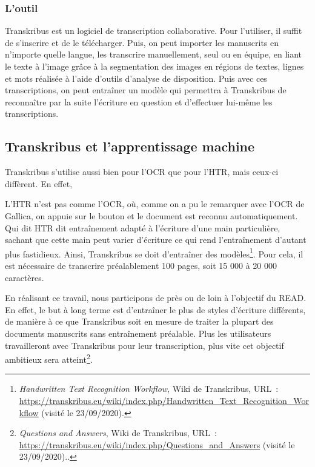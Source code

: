 \subsubsection{L'outil}

Transkribus est un logiciel de transcription collaborative. 
Pour l'utiliser, il suffit de s'inscrire et de le télécharger. Puis, on peut importer les manuscrits en n'importe quelle langue, les transcrire manuellement, seul ou en équipe, en liant le texte à l'image grâce à la segmentation des images en régions de textes, lignes et mots réalisée à l'aide d'outils d'analyse de disposition. Puis avec ces transcriptions, on peut entraîner un modèle qui permettra à Transkribus de reconnaître par la suite l’écriture en question et d’effectuer lui-même les transcriptions.	

\subsection{Transkribus et l'apprentissage machine}

Transkribus s'utilise aussi bien pour l'OCR que pour l'HTR, mais ceux-ci diffèrent. En effet, 
\begin{quote}
\end{quote}
L'HTR n'est pas comme l'OCR, où, comme on a pu le remarquer avec l'OCR de Gallica, on appuie sur le bouton et le document est reconnu automatiquement. Qui dit HTR dit entraînement adapté à l'écriture d'une main particulière, sachant que cette main peut varier d'écriture ce qui rend l'entraînement d'autant plus fastidieux. Ainsi, Transkribus se doit d'entraîner des modèles\footnote{\emph{Handwritten Text Recognition Workflow}, Wiki de Transkribus, URL~: \url{https://transkribus.eu/wiki/index.php/Handwritten_Text_Recognition_Workflow} (visité le 23/09/2020).}. Pour cela, il est nécessaire de transcrire préalablement 100 pages, soit 15 000 à 20 000 caractères. 

En réalisant ce travail, nous participons de près ou de loin à l'objectif du READ. En effet, le but à long terme est d'entraîner le plus de styles d'écriture différents, de manière à ce que Transkribus soit en mesure de traiter la plupart des documents manuscrits sans entraînement préalable. Plus les utilisateurs travailleront avec Transkribus pour leur transcription, plus vite cet objectif ambitieux sera atteint\footnote{\emph{Questions and Answers}, Wiki de Transkribus, URL~: \url{https://transkribus.eu/wiki/index.php/Questions_and_Answers} (visité le 23/09/2020)..}. 

